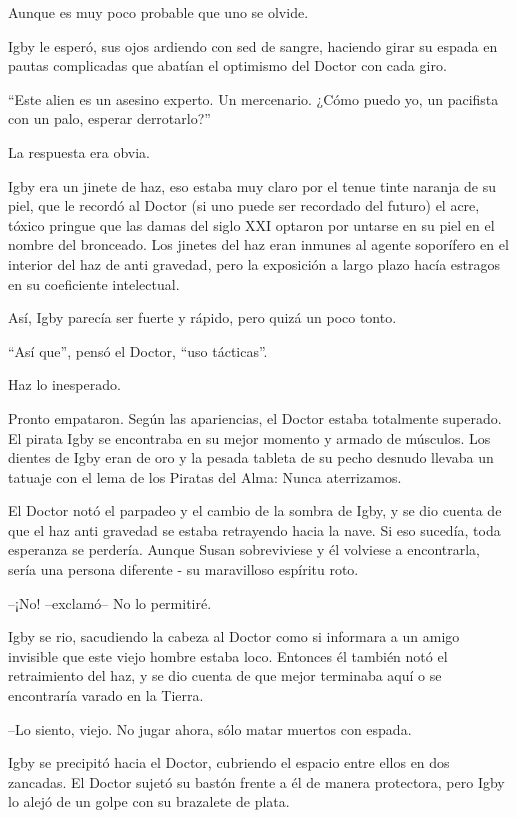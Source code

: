 Aunque es muy poco probable que uno se olvide.
 
Igby le esperó, sus ojos ardiendo con sed de sangre, haciendo girar su espada en pautas complicadas que abatían el optimismo del Doctor con cada giro.
 
``Este alien es un asesino experto. Un mercenario. ¿Cómo puedo yo, un pacifista con un palo, esperar derrotarlo?''
 
La respuesta era obvia.
 
Igby era un jinete de haz, eso estaba muy claro por el tenue tinte naranja de su piel, que le recordó al Doctor (si uno puede ser recordado del futuro) el acre, tóxico pringue que las damas del siglo XXI optaron por untarse en su piel en el nombre del bronceado. Los jinetes del haz eran inmunes al agente soporífero en el interior del haz de anti gravedad, pero la exposición a largo plazo hacía estragos en su coeficiente intelectual.
 
Así, Igby parecía ser fuerte y rápido, pero quizá un poco tonto.
 
``Así que'', pensó el Doctor, ``uso tácticas''.
 
Haz lo inesperado.
 
Pronto empataron. Según las apariencias, el Doctor estaba totalmente superado. El pirata Igby se encontraba en su mejor momento y armado de músculos. Los dientes de Igby eran de oro y la pesada tableta de su pecho desnudo llevaba un tatuaje con el lema de los Piratas del Alma: Nunca aterrizamos.
 
El Doctor notó el parpadeo y el cambio de la sombra de Igby, y se dio cuenta de que el haz anti gravedad se estaba retrayendo hacia la nave. Si eso sucedía, toda esperanza se perdería. Aunque Susan sobreviviese y él volviese a encontrarla, sería una persona diferente - su maravilloso espíritu roto.
 
--¡No! --exclamó-- No lo permitiré.
 
Igby se rio, sacudiendo la cabeza al Doctor como si informara a un amigo invisible que este viejo hombre estaba loco. Entonces él también notó el retraimiento del haz, y se dio cuenta de que mejor terminaba aquí o se encontraría varado en la Tierra.
 
--Lo siento, viejo. No jugar ahora, sólo matar muertos con espada.
 
Igby se precipitó hacia el Doctor, cubriendo el espacio entre ellos en dos zancadas. El Doctor sujetó su bastón frente a él de manera protectora, pero Igby lo alejó de un golpe con su brazalete de plata.
 
